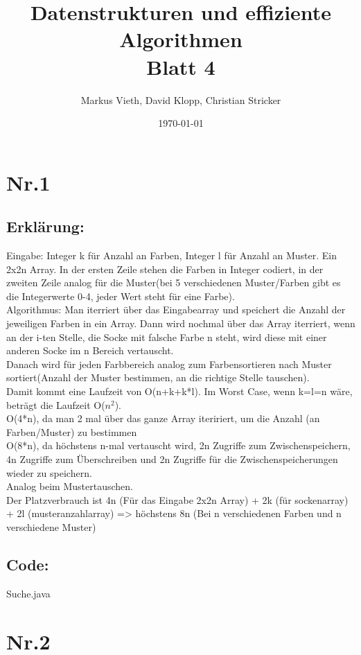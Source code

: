 \documentclass[a4paper,11pt,twoside]{article}
\title{Datenstrukturen und effiziente Algorithmen\\ Blatt 4}
\author{Markus Vieth, David Klopp, Christian Stricker}
\date{\today}
\begin{document}
\maketitle
\cleardoublepage
\pagestyle{myheadings}

\section*{Nr.1}
\subsection*{Erklärung:}
Eingabe: Integer k für Anzahl an Farben, Integer l für Anzahl an Muster. Ein 2x2n Array. In der ersten Zeile stehen die Farben in Integer codiert, in der zweiten Zeile analog für die Muster(bei 5 verschiedenen Muster/Farben gibt es die Integerwerte 0-4, jeder Wert steht für eine Farbe).\\
Algorithmus: Man iterriert über das Eingabearray und speichert die Anzahl der jeweiligen Farben in ein Array. Dann wird nochmal über das Array iterriert, wenn an der i-ten Stelle, die Socke mit falsche Farbe n steht, wird diese mit einer anderen Socke im n Bereich vertauscht.\\
Danach wird für jeden Farbbereich analog zum Farbensortieren nach Muster sortiert(Anzahl der Muster bestimmen, an die richtige Stelle tauschen).\\
Damit kommt eine Laufzeit von O(n+k+k*l). Im Worst Case, wenn k=l=n wäre, beträgt die Laufzeit O($n^2$).\\
O(4*n), da man 2 mal über das ganze Array iteririert, um die Anzahl (an Farben/Muster) zu bestimmen\\
O(8*n), da höchstens n-mal vertauscht wird, 2n Zugriffe zum Zwischenspeichern, 4n Zugriffe zum Überschreiben und 2n Zugriffe für die Zwischenspeicherungen wieder zu speichern.\\
Analog beim Mustertauschen.\\
Der Platzverbrauch ist 4n (Für das Eingabe 2x2n Array) + 2k (für sockenarray) + 2l (musteranzahlarray) => höchstens 8n (Bei n verschiedenen Farben und n verschiedene Muster)

\subsection*{Code:}
 {Suche.java}


\section*{Nr.2}
\end{document}
